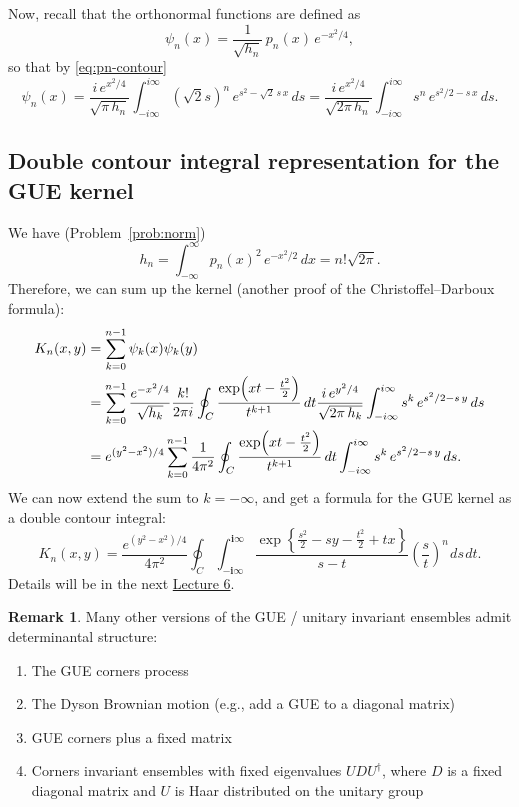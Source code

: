\documentclass[letterpaper,11pt,oneside,reqno]{article}
\numberwithin{equation}{section}
\newcommand{\ssp}{\hspace{1pt}}
\theoremstyle{definition}
\newtheorem{remark}[proposition]{Remark}
\begin{document}
Now, recall that the orthonormal functions are defined as
\[
\psi_n(x)=\frac{1}{\sqrt{h_n}}\,p_n(x)\,e^{-x^2/4},
\]
so that by \eqref{eq:pn-contour}
\[
\psi_n(x)
=\frac{i\,e^{x^2/4}}{\sqrt{\pi\,h_n}}
\int_{-i\infty}^{i\infty}(\sqrt2 s)^n\,e^{s^2-\sqrt{2}\,s\,x}\,ds
=
\frac{i\,e^{x^2/4}}{\sqrt{2\pi\,h_n}}
\int_{-i\infty}^{i\infty}s^n\,e^{s^2/2-s\,x}\,ds.
\]

\subsection{Double contour integral representation for the GUE kernel}

We have (Problem~\ref{prob:norm})
\begin{equation*}
	h_n=\int_{-\infty}^{\infty} p_n(x)^2\,e^{-x^2/2}\,dx=n!\sqrt{2\pi}.
\end{equation*}
Therefore, we can sum up the kernel (another proof of the Christoffel--Darboux formula):
\begin{align*}
	K_n(x,y)&=
	\sum_{k=0}^{n-1}\psi_k(x)\psi_k(y)
	\\&=
	\sum_{k=0}^{n-1}
	\frac{e^{-x^2/4}}{\sqrt{h_k}}\frac{k!}{2\pi i}\oint_C\frac{\exp\Bigl(xt-\frac{t^2}{2}\Bigr)}{t^{k+1}}\,dt
	\frac{i\,e^{y^2/4}}{\sqrt{2\pi\,h_k}}
	\int_{-i\infty}^{i\infty}s^k\,e^{s^2/2-s\,y}\,ds
	\\&=
	e^{(y^2-x^2)/4}
	\sum_{k=0}^{n-1}
	\frac{1}{4\pi^2}\oint_C\frac{\exp\Bigl(xt-\frac{t^2}{2}\Bigr)}{t^{k+1}}\,dt
	\int_{-i\infty}^{i\infty}s^k\,e^{s^2/2-s\,y}\,ds.
\end{align*}
We can now extend the sum to
$k=-\infty$, and get a formula for the
GUE kernel as a double contour integral:
\begin{equation*}
	K_n(x,y)=\frac{e^{(y^2-x^2)/4}}{4\pi^2}
	\oint_C
	\int_{-\mathbf{i}\infty}^{\mathbf{i}\infty}
	\frac{\exp\left\{ \frac{s^2}{2}-sy-\frac{t^2}{2}+tx \right\}}{s-t}\left( \frac{s}{t} \right)^n\ssp ds\ssp dt.
\end{equation*}
Details will be in the next
\href{https://lpetrov.cc/rmt25/rmt25-notes/rmt2025-l06.pdf}{Lecture 6}.

\begin{remark}
Many other versions of the GUE / unitary invariant ensembles admit determinantal structure:
\begin{enumerate}
	\item The GUE corners process \cite{johansson2006eigenvalues}
    \item The Dyson Brownian motion (e.g., add a GUE to a diagonal matrix)
			\cite{nagao1998multilevel}
		\item GUE corners plus a fixed matrix \cite{Ferrari2014PerturbedGUE}
    \item Corners invariant ensembles with fixed eigenvalues $UDU^\dagger$, where $D$ is a fixed diagonal matrix and $U$ is Haar distributed
			on the unitary group \cite{Metcalfe2011GT}
	\end{enumerate}
\end{remark}
\end{document}
